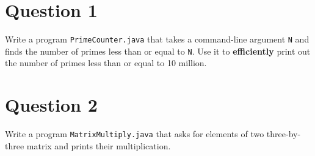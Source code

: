\documentclass[12pt,letterpaper,twoside]{article}
\begin{document}


\section*{Question 1}

Write a program \texttt{PrimeCounter.java} that takes a command-line argument \texttt{N} and finds the number of primes less than or equal to \texttt{N}. Use it to \textbf{efficiently} print out the number of primes less than or equal to 10 million.

\section*{Question 2}

Write a program \texttt{MatrixMultiply.java} that asks for elements of two three-by-three matrix and prints their multiplication.

\end{document}
